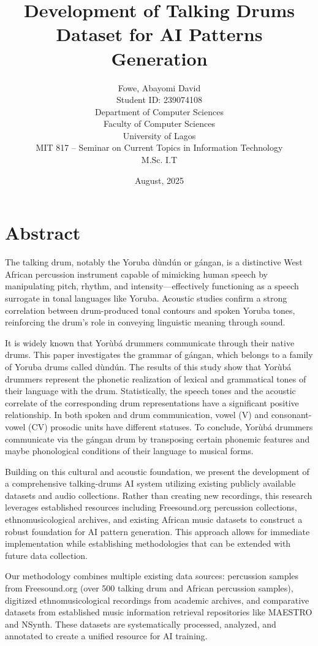 \documentclass[12pt,a4paper]{article}
\title{Development of Talking Drums Dataset for AI Patterns Generation}
\author{Fowe, Abayomi David\\
Student ID: 239074108\\
Department of Computer Sciences\\
Faculty of Computer Sciences\\
University of Lagos\\
MIT 817 -- Seminar on Current Topics in Information Technology\\
M.Sc. I.T}
\date{August, 2025}
\begin{document}
\maketitle

\newpage

\section*{Abstract}

The talking drum, notably the Yoruba dùndún or gángan, is a distinctive West African percussion instrument capable of mimicking human speech by manipulating pitch, rhythm, and intensity—effectively functioning as a speech surrogate in tonal languages like Yoruba. Acoustic studies confirm a strong correlation between drum-produced tonal contours and spoken Yoruba tones, reinforcing the drum's role in conveying linguistic meaning through sound.

It is widely known that Yorùbá drummers communicate through their native drums. This paper investigates the grammar of gángan, which belongs to a family of Yoruba drums called dùndún. The results of this study show that Yorùbá drummers represent the phonetic realization of lexical and grammatical tones of their language with the drum. Statistically, the speech tones and the acoustic correlate of the corresponding drum representations have a significant positive relationship. In both spoken and drum communication, vowel (V) and consonant-vowel (CV) prosodic units have different statuses. To conclude, Yorùbá drummers communicate via the gángan drum by transposing certain phonemic features and maybe phonological conditions of their language to musical forms.

Building on this cultural and acoustic foundation, we present the development of a comprehensive talking-drums AI system utilizing existing publicly available datasets and audio collections. Rather than creating new recordings, this research leverages established resources including Freesound.org percussion collections, ethnomusicological archives, and existing African music datasets to construct a robust foundation for AI pattern generation. This approach allows for immediate implementation while establishing methodologies that can be extended with future data collection.

Our methodology combines multiple existing data sources: percussion samples from Freesound.org (over 500 talking drum and African percussion samples), digitized ethnomusicological recordings from academic archives, and comparative datasets from established music information retrieval repositories like MAESTRO and NSynth. These datasets are systematically processed, analyzed, and annotated to create a unified resource for AI training.
\end{document}
